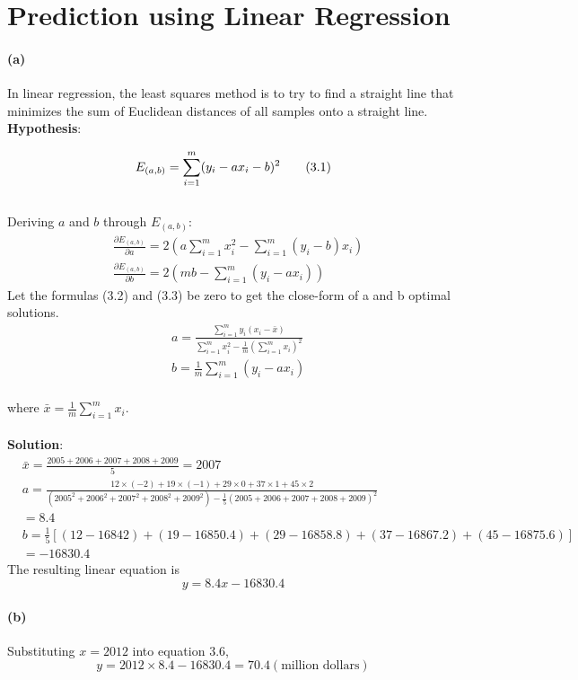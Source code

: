 \documentclass[UTF8]{article}
\begin{document}
\section{Prediction using Linear Regression}
\paragraph{(a)}In linear regression, the least squares method is to try to find a straight line that minimizes the sum of Euclidean distances of all samples onto a straight line. \\
\large {\textbf{Hypothesis}}:

\begin{equation}
  E_{(a,b)}= \sum_{i=1}^m(y_i-ax_i-b)^2 \tag{$3.1$} \\
\end{equation} \\
Deriving $a$ and $b$ through $E_{(a,b)}$: \\
\begin{align*}
&\frac{\partial E_{(a,b)}}{\partial a}=2(a \sum_{i=1}^m x_i^2-\sum_{i=1}^m(y_i-b)x_i) \tag{$3.2$}\\
&\frac{\partial E_{(a,b)}}{\partial b}=2(mb-\sum_{i=1}^m(y_i-ax_i)) \tag{$3.3$}
\end{align*}
Let the formulas (3.2) and (3.3) be zero to get the close-form of a and b optimal solutions. \\
\begin{align*}
&a = \frac{\sum_{i=1}^my_i(x_i-\bar{x})}{\sum_{i=1}^m x_i^2-\frac{1}{m}(\sum_{i=1}^m x_i)^2} \tag{$3.4$} \\
&b =\frac{1}{m}\sum_{i=1}^m(y_i - ax_i) \tag{$3.5$}
\end{align*} \\
where $\bar{x} = \frac{1}{m}\sum_{i=1}^m x_i$. \\ \\
\large {\textbf{Solution}}: \\
\begin{align*}
& \bar{x} = \frac{2005+2006+2007+2008+2009}{5} = 2007 \\
& a = \frac{12 \times (-2) + 19 \times (-1) + 29 \times 0 + 37 \times 1 + 45 \times 2}{(2005^2+2006^2+2007^2+2008^2+2009^2)-\frac{1}{5}(2005+2006+2007+2008+2009)^2} \\
&= 8.4 \\
&b = \frac{1}{5}[(12-16842)+(19-16850.4)+(29- 16858.8)+(37 - 16867.2) +(45 - 16875.6)] \\
&=-16830.4
\end{align*}
The resulting linear equation is
\begin{equation}
  y = 8.4x - 16830.4 \tag{$3.6$}
\end{equation}

\paragraph{(b)}
Substituting $x=2012$ into equation 3.6,
$$
y = 2012 \times 8.4 - 16830.4 = 70.4 (\text{million dollars})
$$
\end{document}
